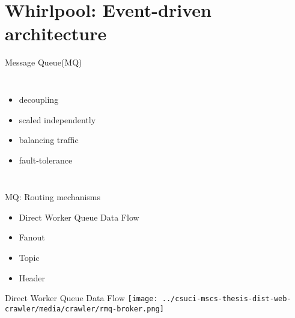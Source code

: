 \documentclass[9pt]{beamer}
\begin{document}

\section[Event-driven]{Whirlpool: Event-driven architecture}
\begin{frame}[plain]
\end{frame}


\begin{frame}{Message Queue(MQ)}
  \begin{columns}
    \begin{itemize}
      \pause
    \item decoupling
      \pause
    \item scaled independently
      \pause
     \item balancing traffic
       \pause
     \item fault-tolerance
    \end{itemize}
  \end{columns}
  
\end{frame}


\begin{frame}{MQ: Routing mechanisms}
  \begin{itemize}
    \pause
  \item Direct Worker Queue Data Flow
    \pause
  \item Fanout
    \pause
  \item Topic
    \pause
  \item Header
  \end{itemize}
\end{frame}


\begin{frame}{Direct Worker Queue Data Flow}
  \centering
  \texttt{[image: ../csuci-mscs-thesis-dist-web-crawler/media/crawler/rmq-broker.png]}
\end{frame}
\end{document}
